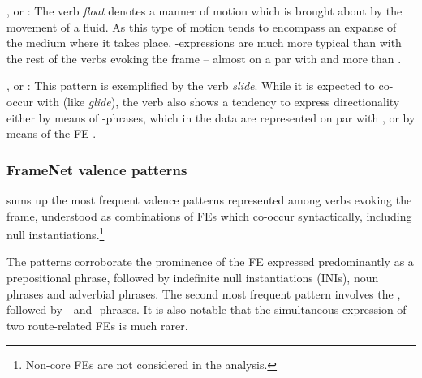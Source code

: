 \documentclass[output=paper,colorlinks,citecolor=brown]{langscibook}
\begin{document}
,  or : The verb \textit{float} denotes a manner of motion which is brought about by the movement of a fluid. As this type of motion tends to encompass an expanse of the medium where it takes place, -expressions are much more typical than with the rest of the verbs evoking the frame -- almost on a par with  and more than .

,  or : This pattern is exemplified by the verb \textit{slide}. While it is expected to co-occur with  (like \textit{glide}), the verb also shows a tendency to express directionality either by means of -phrases, which in the data are represented on par with , or by means of the FE . 


\subsubsection{FrameNet valence patterns}

 sums up the most frequent valence patterns represented among verbs evoking the  frame, understood as combinations of FEs which co-occur syntactically, including null instantiations.\footnote{Non-core FEs are not considered in the analysis.}

The patterns corroborate the prominence of the  FE expressed predominantly as a prepositional phrase, followed by indefinite null instantiations (INIs), noun phrases and adverbial phrases. The second most frequent pattern involves the , followed by  - and -phrases. It is also notable that the simultaneous expression of two route-related FEs is much rarer.
\end{document}
